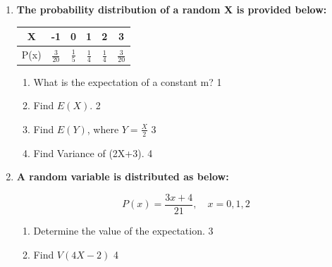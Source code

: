 \documentclass[a4paper,oneside, margin=1.4in]{book}
\begin{document}
\begin{enumerate}
	  \begin{center}
	  $\displaystyle f(x) = \frac{1}{30} (k+2x); 2 < x < 5$
	  \end{center}
  
  \begin{enumerate}
    \item
    What is a random variable? \hfill 1
    \item
		Is probability a discrete variable? Explain in brief. \hfill 2
    \item  
	Find the value of k.  \hfill 3
    \item
	Determine the expectation and variance. \hfill 4
  \end{enumerate}
  
   \item
	  \textbf{The probability distribution of a random X is provided below:} 
	  
	  \begin{table}[h]
	  \centering
\begin{tabular}{c|ccccc}
X & -1 & 0 & 1 & 2 & 3 \\ \hline
P(x) & $\frac 3{20}$ & $\frac 15$ & $\frac 14$ & $\frac 14$ & $\frac 3{20}$
\end{tabular}
\end{table}
  
  \begin{enumerate}
    \item
	What is the expectation of a constant m? \hfill 1
    \item
	Find $E(X).$ \hfill 2
    \item  
	Find $E(Y)$, where $Y = \frac X2$  \hfill 3
    \item
	Find Variance of (2X+3). \hfill 4
  \end{enumerate}
  
    
        \item \textbf{A random variable is distributed as below:}
        
        \begin{center}
  \textbf{\[
P(x) = \frac{3x + 4}{21}, \quad x = 0, 1, 2
\]
}
  \end{center}

  \begin{enumerate}
    \item
    	Determine the value of the expectation. \hfill 3
     \item
     	Find $V(4X-2)$ \hfill 4
  \end{enumerate}
  

\end{enumerate}
\end{document}
